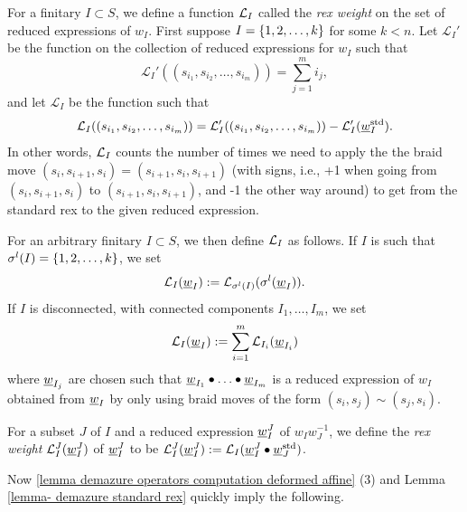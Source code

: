\begin{defn} \label{defn-rex weight} For a finitary $I\subset S$, we define a function  $\mathcal{L}_I$ called the \emph{rex weight} on the set of reduced expressions of $w_I$. 
    First suppose $I=\{1,2, \ldots, k\}$ for some $k<n$.
    Let $\mathcal{L}_I'$ be the function on the collection of reduced expressions for $w_I$ such that 
    $$\mathcal{L}_I'((s_{i_1},s_{i_2},\ldots, s_{i_m}))=\sum_{j=1}^{m}i_j,$$
     and let $\mathcal{L}_I$ be the function such that 
    $$\mathcal{L}_I((s_{i_1},s_{i_2},\ldots, s_{i_m}))= \mathcal{L}_I'((s_{i_1},s_{i_2},\ldots, s_{i_m}))-\mathcal{L}_I'(\underline{w}_I^{\operatorname{std}}).$$
    In other words, $\mathcal{L}_I$ counts the number of times we need to apply the the braid move $(s_i,s_{i+1},s_i)=(s_{i+1},s_i,s_{i+1})$ (with signs, i.e., +1 when going from $(s_i,s_{i+1},s_i)$ to $(s_{i+1},s_i,s_{i+1})$, and -1 the other way around) to get from the standard rex to the given reduced expression.

    For an arbitrary finitary $I \subset S$, we then define $\mathcal{L}_I$ as follows.
    If $I$ is such that $\sigma^l(I)=\{1,2, \ldots, k\}$, we set $$\mathcal{L}_I(\underline{w}_I):=\mathcal{L}_{\sigma^l(I)}(\sigma^l(\underline{w}_I)).$$
    If $I$ is disconnected, with connected components $I_1, \ldots ,I_m$, we set
    $$\mathcal{L}_I(\underline{w}_I):=\sum_{i=1}^m\mathcal{L}_{I_i}(\underline{w}_{I_i})$$
    where $\underline{w}_{I_j}$ are chosen such that
    $\underline{w}_{I_1}\bullet \ldots \bullet \underline{w}_{I_m}$ is a reduced expression of $w_I$ obtained from $\underline{w}_I$ by only using braid moves
    of the form $(s_i,s_j)\sim(s_j,s_i)$.
\end{defn}

\begin{defn}\label{defn-rex weight2}
    For a subset $J$ of $I$ and a reduced expression $\underline{w}_I^J$ of $w_Iw_J^{-1}$, we define the \emph{rex weight} $\mathcal{L}_I^J(\underline{w}_I^J)$ of $\underline{w}_I^J$ to be $\mathcal{L}_I^J(\underline{w}_I^J):=\mathcal{L}_I(\underline{w}_I^J \bullet \underline{w}_J^{\operatorname{std}})$.
\end{defn}
    
    Now \cref{lemma demazure operators computation deformed affine} (3) and Lemma \ref{lemma- demazure standard rex} quickly imply the following.
    
